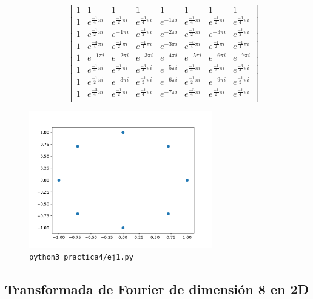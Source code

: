\documentclass[11pt, spanish]{article}
\begin{document}
\[=
\begin{bmatrix}
1 & 1 & 1 & 1 & 1 & 1 & 1 & 1 \\
1 & e^{\frac{-1}{4} \pi i} & e^{\frac{-1}{2} \pi i} & e^{\frac{-3}{4} \pi i} & e^{-1 \pi i} & e^{\frac{-1}{4} \pi i} &
e^{\frac{-1}{2} \pi i} & e^{\frac{-3}{4} \pi i} \\
1 & e^{\frac{-1}{2} \pi i} & e^{-1 \pi i} & e^{\frac{-1}{2} \pi i} & e^{-2 \pi i} & e^{\frac{-1}{2} \pi i} & e^{-3 \pi
i} & e^{\frac{-1}{2} \pi i} \\
1 & e^{\frac{-3}{4} \pi i} & e^{\frac{-1}{2} \pi i} & e^{\frac{-1}{4} \pi i} & e^{-3 \pi i} & e^{\frac{-3}{4} \pi i} &
e^{\frac{-1}{2} \pi i} & e^{\frac{-1}{4} \pi i} \\
1 & e^{-1 \pi i} & e^{-2 \pi i} & e^{-3 \pi i} & e^{-4 \pi i} & e^{-5 \pi i} & e^{-6 \pi i} & e^{-7 \pi i} \\
1 & e^{\frac{-1}{4} \pi i} & e^{\frac{-1}{2} \pi i} & e^{\frac{-3}{4} \pi i} & e^{-5 \pi i} & e^{\frac{-1}{4} \pi i} &
e^{\frac{-1}{2} \pi i} & e^{\frac{-3}{4} \pi i} \\
1 & e^{\frac{-1}{2} \pi i} & e^{-3 \pi i} & e^{\frac{-1}{2} \pi i} & e^{-6 \pi i} & e^{\frac{-1}{2} \pi i} & e^{-9 \pi
i} & e^{\frac{-1}{2} \pi i} \\
1 & e^{\frac{-3}{4} \pi i} & e^{\frac{-1}{2} \pi i} & e^{\frac{-1}{4} \pi i} & e^{-7 \pi i} & e^{\frac{-3}{4} \pi i} &
e^{\frac{-1}{2} \pi i} & e^{\frac{-1}{4} \pi i} \\
\end{bmatrix}
\]

\begin{figure}[H]
\centering
  \includegraphics[height=6cm]{informe-imgs/ej1.pdf}
  \caption{\texttt{python3 practica4/ej1.py}}
\end{figure}

\subsection{Transformada de Fourier de dimensión 8 en 2D}
\end{document}
